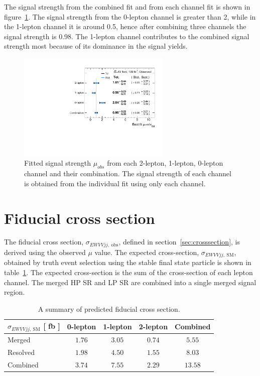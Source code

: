 The signal strength from the combined fit and from each channel fit is shown in figure~\ref{fig:muhat}.
The signal strength from the 0-lepton channel is greater than 2, while in the 1-lepton channel it is around 0.5, hence after combining three channels the signal strength is 0.98.
The 1-lepton channel contributes to the combined signal strength most because of its dominance in the signal yields.
\begin{figure}[]
      \centering
        \includegraphics[width=0.65\textwidth]{figures/Muhat_channels}
        \caption{Fitted signal strength $\mu_{obs}$ from each 2-lepton, 1-lepton, 0-lepton channel and their combination. The signal strength of each channel is obtained from the individual fit using only each channel.}
       \label{fig:muhat}
\end{figure}

\section{Fiducial cross section}
The fiducial cross section, $\sigma_{EWVVjj,~\mathrm{obs}}$, defined in section~\ref{sec:crosssection}, is derived using the observed $\mu$ value.
The expected cross-section, $\sigma_{EWVVjj,~\mathrm{SM}}$, obtained by truth event selection using the stable final state particle is shown in table~\ref{tab:expxsec}.
The expected cross-section is the sum of the cross-section of each lepton channel. 
The merged HP SR and LP SR are combined into a single merged signal region.
\begin{table}[H]
\begin{center}
\begin{tabular}{|l|c|c|c||c|}
\hline$\sigma_{EWVVjj,~\mathrm{SM}}$ [ fb ]& 0-lepton & 1-lepton & 2-lepton & Combined\\ \hline 
Merged                                     & $1.76 $   & $3.05 $   & $0.74 $   & $ 5.55$\\  \hline 
Resolved                                   & $1.98 $   & $4.50 $   & $1.55 $   & $ 8.03$\\ \hline
Combined                                   & $3.74 $   & $7.55 $   & $2.29 $   & $ 13.58$\\ \hline
\end{tabular}
\caption{\label{tab:expxsec} A summary of predicted fiducial cross section. }
\end{center}
\end{table}


